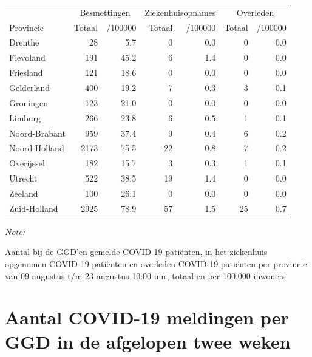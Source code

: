 \documentclass[
  english,
  man,floatsintext]{apa6}
\begin{document}
\begin{table}[H]
\centering
\begin{threeparttable}
\begin{tabular}{lrrrrrr}
\toprule
\multicolumn{1}{c}{ } & \multicolumn{2}{c}{Besmettingen} & \multicolumn{2}{c}{Ziekenhuisopnames} & \multicolumn{2}{c}{Overleden} \\
\cmidrule(l{3pt}r{3pt}){2-3} \cmidrule(l{3pt}r{3pt}){4-5} \cmidrule(l{3pt}r{3pt}){6-7}
Provincie & Totaal & /100000 & Totaal & /100000 & Totaal & /100000\\
\midrule
Drenthe & 28 & 5.7 & 0 & 0.0 & 0 & 0.0\\
Flevoland & 191 & 45.2 & 6 & 1.4 & 0 & 0.0\\
Friesland & 121 & 18.6 & 0 & 0.0 & 0 & 0.0\\
Gelderland & 400 & 19.2 & 7 & 0.3 & 3 & 0.1\\
Groningen & 123 & 21.0 & 0 & 0.0 & 0 & 0.0\\
Limburg & 266 & 23.8 & 6 & 0.5 & 1 & 0.1\\
Noord-Brabant & 959 & 37.4 & 9 & 0.4 & 6 & 0.2\\
Noord-Holland & 2173 & 75.5 & 22 & 0.8 & 7 & 0.2\\
Overijssel & 182 & 15.7 & 3 & 0.3 & 1 & 0.1\\
Utrecht & 522 & 38.5 & 19 & 1.4 & 0 & 0.0\\
Zeeland & 100 & 26.1 & 0 & 0.0 & 0 & 0.0\\
Zuid-Holland & 2925 & 78.9 & 57 & 1.5 & 25 & 0.7\\
\bottomrule
\end{tabular}
\begin{tablenotes}
\item \textit{Note: } 
\item Aantal bij de GGD’en gemelde COVID-19 patiënten, in het ziekenhuis opgenomen COVID-19 patiënten en overleden COVID-19 patiënten per provincie van 09 augustus t/m 23 augustus 10:00 uur, totaal en per 100.000 inwoners
\end{tablenotes}
\end{threeparttable}
\end{table}

\newpage

\hypertarget{aantal-covid-19-meldingen-per-ggd-in-de-afgelopen-twee-weken}{%
\section{Aantal COVID-19 meldingen per GGD in de afgelopen twee weken}\label{aantal-covid-19-meldingen-per-ggd-in-de-afgelopen-twee-weken}}
\end{document}
